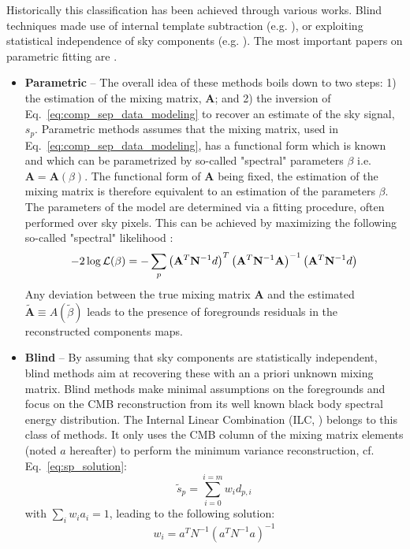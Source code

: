 Historically this classification has been achieved through various works. Blind techniques made use of internal template subtraction (e.g. \cite{bennett92,hansen06,katayama11}), or exploiting statistical independence of sky components (e.g. \cite{delabrouille03,maino07,bonaldi06,stolyarov05}). The most important papers on parametric fitting are \cite{brandt94,eriksen06, stompor09}.

\begin{itemize}
	\item \textbf{Parametric} -- The overall idea of these methods boils down to two steps: 1) the estimation of the mixing matrix, $\mathbf{A}$; and 2) the inversion of Eq.~\ref{eq:comp_sep_data_modeling} to recover an estimate of the sky signal, $s_p$.
	Parametric methods assumes that the mixing matrix, used in Eq.~\ref{eq:comp_sep_data_modeling}, has a functional form which is known and which can be parametrized by so-called "spectral" parameters $\beta$ i.e. $\mathbf{A} = \mathbf{A}(\beta)$. The functional form of $\mathbf{A}$ being fixed, the estimation of the mixing matrix is therefore equivalent to an estimation of the parameters $\beta$. The parameters of the model are determined via a fitting procedure, often performed over sky pixels. This can be achieved by maximizing the following so-called "spectral" likelihood \cite{brandt94,eriksen06}:
	\begin{eqnarray}
		\centering
			-2\log \mathcal{L}(\beta) = - \sum_p \left( \mathbf{A}^T\mathbf{N}^{-1} d\right)^T\left( \mathbf{A}^T\mathbf{N}^{-1} \mathbf{A}\right)^{-1}\left( \mathbf{A}^T\mathbf{N}^{-1} d\right)
	\end{eqnarray}
Any deviation between the true mixing matrix $\mathbf{A}$ and the estimated $\mathbf{\tilde A} \equiv A(\tilde \beta)$ leads to the presence of foregrounds residuals in the reconstructed components maps.
	\item \textbf{Blind} -- By assuming that sky components are statistically independent, blind methods aim at recovering these with an a priori unknown mixing matrix. Blind methods make minimal assumptions on the foregrounds and focus on the CMB reconstruction from its well known black body spectral energy distribution. The Internal Linear Combination (ILC, \cite{tegmark03}) belongs to this class of methods. It only uses the CMB column of the mixing matrix elements (noted $a$ hereafter) to perform the minimum variance reconstruction, cf. Eq.~\ref{eq:sp_solution}:
\begin{equation}
  \tilde s_p = \sum_{i=0}^{i=m} w_i d_{p,i}
\end{equation}
with $\sum_i  w_i a_i = 1$, leading to the following solution:
\begin{equation}
  w_i = a^T N^{-1} (a^TN^{-1} a)^{-1}
\end{equation}


\end{itemize}
